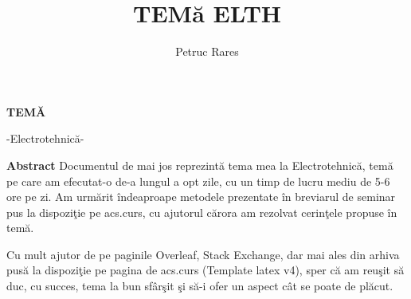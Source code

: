\documentclass[multi=false, tikz, border=2mm]{article}
\title{TEM\u{a} ELTH}
\author{Petruc Rares}
\begin{document}

\thispagestyle{plain}
\begin{center}

	\Large
	\textbf{TEM\u{A}}
		
	\vspace{0.4cm}
	\large
	-Electrotehnic\u{a}-
	
	\vspace{4cm}

\end{center}


\vspace{0.9cm}
\textbf{Abstract} Documentul de mai jos reprezint\u{a} tema mea la Electrotehnic\u{a}, tem\u{a} pe care am efecutat-o de-a lungul a opt zile, cu un timp de lucru mediu de 5-6 ore pe zi. Am urm\u{a}rit \^{i}ndeaproape metodele prezentate \^{i}n breviarul de seminar pus la dispozi\c{t}ie pe acs.curs, cu ajutorul c\u{a}rora am rezolvat cerin\c{t}ele propuse \^{i}n tem\u{a}.



Cu mult ajutor de pe paginile Overleaf, Stack Exchange, dar mai ales din arhiva pus\u{a} la dispozi\c{t}ie pe pagina de acs.curs (Template latex v4), sper c\u{a} am reu\c{s}it s\u{a} duc, cu succes, tema la bun sf\^{a}r\c{s}it \c{s}i s\u{a}-i ofer un aspect c\^{a}t se poate de pl\u{a}cut.\\


\vspace{4cm}

\noindent
{}
\end{document}
